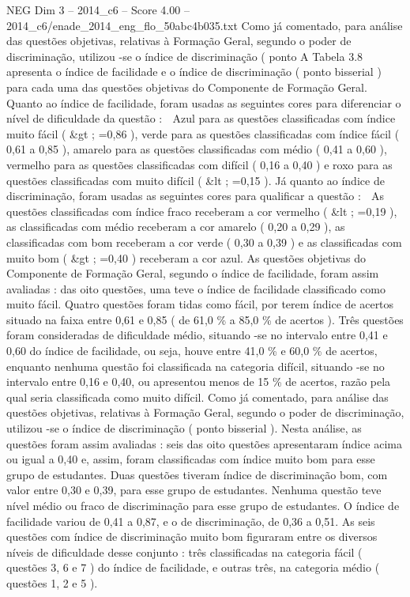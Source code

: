 \begin{textsample}{NEG Dim 3 – 2014\_c6 – Score 4.00 – 2014\_c6/enade\_2014\_eng\_flo\_50abc4b035.txt}
Como já comentado, para análise das questões objetivas, relativas à Formação Geral, segundo o poder de discriminação, utilizou -se o índice de discriminação ( ponto A Tabela 3.8 apresenta o índice de facilidade e o índice de discriminação ( ponto bisserial ) para cada uma das questões objetivas do Componente de Formação Geral.
Quanto ao índice de facilidade, foram usadas as seguintes cores para diferenciar o nível de dificuldade da questão :  Azul para as questões classificadas com índice muito fácil ( \&gt ; =0,86 ), verde para as questões classificadas com índice fácil ( 0,61 a 0,85 ), amarelo para as questões classificadas com médio ( 0,41 a 0,60 ), vermelho para as questões classificadas com difícil ( 0,16 a 0,40 ) e roxo para as questões classificadas com muito difícil ( \&lt ; =0,15 ).
Já quanto ao índice de discriminação, foram usadas as seguintes cores para qualificar a questão :  As questões classificadas com índice fraco receberam a cor vermelho ( \&lt ; =0,19 ), as classificadas com médio receberam a cor amarelo ( 0,20 a 0,29 ), as classificadas com bom receberam a cor verde ( 0,30 a 0,39 ) e as classificadas com muito bom ( \&gt ; =0,40 ) receberam a cor azul.
As questões objetivas do Componente de Formação Geral, segundo o índice de facilidade, foram assim avaliadas : das oito questões, uma teve o índice de facilidade classificado como muito fácil.
Quatro questões foram tidas como fácil, por terem índice de acertos situado na faixa entre 0,61 e 0,85 ( de 61,0 \% a 85,0 \% de acertos ).
Três questões foram consideradas de dificuldade médio, situando -se no intervalo entre 0,41 e 0,60 do índice de facilidade, ou seja, houve entre 41,0 \% e 60,0 \% de acertos, enquanto nenhuma questão foi classificada na categoria difícil, situando -se no intervalo entre 0,16 e 0,40, ou apresentou menos de 15 \% de acertos, razão pela qual seria classificada como muito difícil.
Como já comentado, para análise das questões objetivas, relativas à Formação Geral, segundo o poder de discriminação, utilizou -se o índice de discriminação ( ponto bisserial ).
Nesta análise, as questões foram assim avaliadas : seis das oito questões apresentaram índice acima ou igual a 0,40 e, assim, foram classificadas com índice muito bom para esse grupo de estudantes.
Duas questões tiveram índice de discriminação bom, com valor entre 0,30 e 0,39, para esse grupo de estudantes.
Nenhuma questão teve nível médio ou fraco de discriminação para esse grupo de estudantes.
O índice de facilidade variou de 0,41 a 0,87, e o de discriminação, de 0,36 a 0,51.
As seis questões com índice de discriminação muito bom figuraram entre os diversos níveis de dificuldade desse conjunto : três classificadas na categoria fácil ( questões 3, 6 e 7 ) do índice de facilidade, e outras três, na categoria médio ( questões 1, 2 e 5 ).

\end{textsample}
